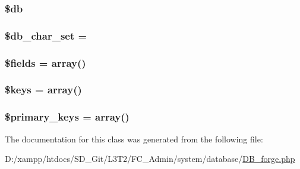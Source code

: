 \subsubsection[{\$db}]{\setlength{\rightskip}{0pt plus 5cm}\$db\hspace{0.3cm}{\ttfamily [protected]}}\label{class_c_i___d_b__forge_a1fa3127fc82f96b1436d871ef02be319}
\hypertarget{class_c_i___d_b__forge_a6e90c3633cd0984a7e8de501f7771c53}{}
\subsubsection[{\$db\+\_\+char\+\_\+set}]{\setlength{\rightskip}{0pt plus 5cm}\$db\+\_\+char\+\_\+set = \textquotesingle{}\textquotesingle{}}\label{class_c_i___d_b__forge_a6e90c3633cd0984a7e8de501f7771c53}
\hypertarget{class_c_i___d_b__forge_ab2303c817e3b402b77b7f99627b9c319}{}
\subsubsection[{\$fields}]{\setlength{\rightskip}{0pt plus 5cm}\$fields = array()}\label{class_c_i___d_b__forge_ab2303c817e3b402b77b7f99627b9c319}
\hypertarget{class_c_i___d_b__forge_af20635b6c08e03bfee9e3fc036fa80f3}{}
\subsubsection[{\$keys}]{\setlength{\rightskip}{0pt plus 5cm}\$keys = array()}\label{class_c_i___d_b__forge_af20635b6c08e03bfee9e3fc036fa80f3}
\hypertarget{class_c_i___d_b__forge_a09349689030ba7198a094abf357c78bc}{}
\subsubsection[{\$primary\+\_\+keys}]{\setlength{\rightskip}{0pt plus 5cm}\$primary\+\_\+keys = array()}\label{class_c_i___d_b__forge_a09349689030ba7198a094abf357c78bc}


The documentation for this class was generated from the following file\+:\begin{DoxyCompactItemize}
\item 
D\+:/xampp/htdocs/\+S\+D\+\_\+\+Git/\+L3\+T2/\+F\+C\+\_\+\+Admin/system/database/\hyperlink{_d_b__forge_8php}{D\+B\+\_\+forge.\+php}\end{DoxyCompactItemize}
